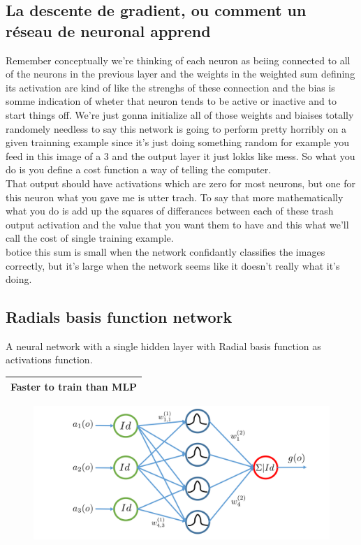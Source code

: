 \subsection{La descente de gradient, ou comment un réseau de neuronal apprend}
Remember conceptually we're thinking of each neuron as beiing connected to all of the neurons in the previous layer and the weights in the weighted sum defining its activation are kind of like the strenghs of these connection and the bias is somme indication of wheter that neuron tends to be active or inactive and to start things off. We're just gonna initialize all of those weights and biaises totally randomely needless to say this network is going to perform pretty horribly on a given trainning example since it's just doing something random for example you feed in this image of a 3 and the output layer it just lokks like mess. So what you do is you define a cost function a way of telling the computer.\\
That output should have activations which are zero for most neurons, but one for this neuron what you gave me is utter trach. To say that more mathematically what you do is add up the squares of differances between each of these trash output activation and the value that you want them to have and this what we'll call the cost of single training example.\\
botice this sum is small when the network confidantly classifies the images correctly, but it's large when the network seems like it doesn't really what it's doing.

\subsection{Radials basis function network}
A neural network with a single hidden layer with Radial basis function as activations function.

  \begin{table}[!h]
    \begin{center}
    \begin{tabular}{| m{8em}|}
    \hline
    \rowcolor{vert.g} \textbf{Faster to train than MLP}    \\\hline
    \end{tabular}
    \end{center}
    \end{table}

\begin{figure}[H]
    \centering
    \includegraphics[scale = 0.3]{Question10/RadialBasisFunctionNetwork.png}
    \label{fig:my_label}
\end{figure}
